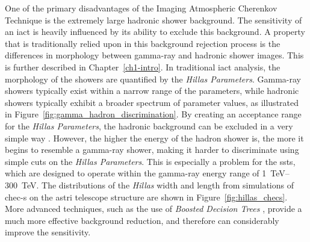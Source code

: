 One of the primary disadvantages of the Imaging Atmospheric Cherenkov Technique is the extremely large hadronic shower background. The sensitivity of an \gls{iact} is heavily influenced by its ability to exclude this background. A property that is traditionally relied upon in this background rejection process is the differences in morphology between gamma-ray and hadronic shower images. This is further described in Chapter~\ref{ch1-intro}. In traditional \gls{iact} analysis, the morphology of the showers are quantified by the \textit{Hillas Parameters}. Gamma-ray showers typically exist within a narrow range of the parameters, while hadronic showers typically exhibit a broader spectrum of parameter values, as illustrated in Figure~\ref{fig:gamma_hadron_discrimination}. By creating an acceptance range for the \textit{Hillas Parameters}, the hadronic background can be excluded in a very simple way \cite{Dickinson2010,Fegan1999a,Hillas1996a}. However, the higher the energy of the hadron shower is, the more it begins to resemble a gamma-ray shower, making it harder to discriminate using simple cuts on the \textit{Hillas Parameters}. This is especially a problem for the \glspl{sst}, which are designed to operate within the gamma-ray energy range of \SIrange{1}{300}{TeV}. The distributions of the \textit{Hillas} width and length from simulations of \gls{chec-s} on the \gls{astri} telescope structure are shown in Figure~\ref{fig:hillas_checs}. More advanced techniques, such as the use of \textit{Boosted Decision Trees} \cite{Ohm2009}, provide a much more effective background reduction, and therefore can considerably improve the sensitivity.
